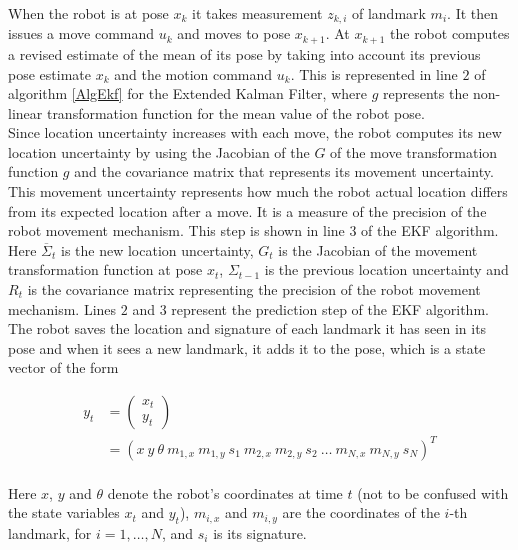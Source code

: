 \documentclass[conference]{IEEEtran}
\begin{document}
When the robot is at pose $x_k$ it takes measurement $z_{k,i}$ of landmark $m_i$. It then issues a move command $u_k$ and moves to pose $x_{k+1}$. At $x_{k+1}$ the robot computes a revised estimate of the mean of its pose by taking into account its previous pose estimate $x_k$ and the motion command $u_k$. This is represented in line $2$ of algorithm \ref{AlgEkf} for the Extended Kalman Filter, where $g$ represents the non-linear transformation function for the mean value of the robot pose.\\

Since location uncertainty increases with each move, the robot computes its new location uncertainty by using the Jacobian of the $G$ of the move transformation function $g$ and the covariance matrix that represents its movement uncertainty. This movement uncertainty represents how much the robot actual location differs from its expected location after a move. It is a measure of the precision of the robot movement mechanism. This step is shown in line $3$ of the EKF algorithm. Here  $\overline \Sigma_t$ is the new location uncertainty, $G_t$ is the Jacobian of the movement transformation function at pose $x_t$, $\Sigma_{t-1}$ is the previous location uncertainty and $R_t$ is the covariance matrix representing the precision of the robot movement mechanism. Lines $2$ and $3$ represent the prediction step of the EKF algorithm.\\

The robot saves the location and signature of each landmark it has seen in its pose \cite{thrun} and when it sees a new landmark, it adds it to the pose, which is a state vector of the form

\begin{equation}\label{StateVector}
\begin{aligned}
y_t &= \begin{pmatrix}
		x_t\\
		y_t
	   \end{pmatrix}\\
& = (x~y~\theta~m_{1,x}~m_{1,y}~s_1~m_{2,x}~m_{2,y}~s_2~\ldots~m_{N,x}~m_{N,y}~s_N)^T\\
\end{aligned}
\end{equation}

Here $x$, $y$ and $\theta$ denote the robot's coordinates at time $t$ (not to be confused with the state variables $x_t$ and $y_t$), $m_{i,x}$ and $m_{i,y}$ are the coordinates of the $i$-th landmark, for $i=1,\dots,N$, and $s_i$ is its signature.\\
\end{document}
